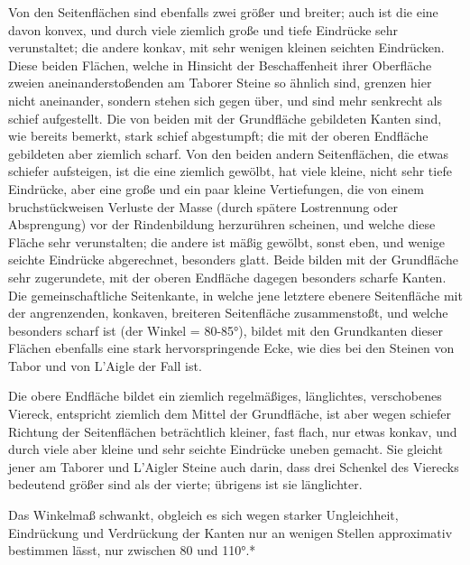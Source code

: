 \documentclass[a4paper, 11pt, oneside, german]{article}
\begin{document}
Von den Seitenflächen sind ebenfalls zwei größer und breiter; auch ist die eine davon konvex, und durch viele ziemlich große und tiefe Eindrücke sehr verunstaltet; die andere konkav, mit sehr wenigen kleinen seichten Eindrücken. Diese beiden Flächen, welche in Hinsicht der Beschaffenheit ihrer Oberfläche zweien aneinanderstoßenden am Taborer Steine so ähnlich sind, grenzen hier nicht aneinander, sondern stehen sich gegen über, und sind mehr senkrecht als schief aufgestellt. Die von beiden mit der Grundfläche gebildeten Kanten sind, wie bereits bemerkt, stark schief abgestumpft; die mit der oberen Endfläche gebildeten aber ziemlich scharf. Von den beiden andern Seitenflächen, die etwas schiefer aufsteigen, ist die eine ziemlich gewölbt, hat viele kleine, nicht sehr tiefe Eindrücke, aber eine große und ein paar kleine Vertiefungen, die von einem bruchstückweisen Verluste der Masse (durch spätere Lostrennung oder Absprengung) vor der Rindenbildung herzurühren scheinen, und welche diese Fläche sehr verunstalten; die andere ist mäßig gewölbt, sonst eben, und wenige seichte Eindrücke abgerechnet, besonders glatt. Beide bilden mit der Grundfläche sehr zugerundete, mit der oberen Endfläche dagegen besonders scharfe Kanten. Die gemeinschaftliche Seitenkante, in welche jene letztere ebenere Seitenfläche mit der angrenzenden, konkaven, breiteren Seitenfläche zusammenstoßt, und welche besonders scharf ist (der Winkel = 80-85°), bildet mit den Grundkanten dieser Flächen ebenfalls eine stark hervorspringende Ecke, wie dies bei den Steinen von Tabor und von L'Aigle der Fall ist.

Die obere Endfläche bildet ein ziemlich regelmäßiges, länglichtes, verschobenes Viereck, entspricht ziemlich dem Mittel der Grundfläche, ist aber wegen schiefer Richtung der Seitenflächen beträchtlich kleiner, fast flach, nur etwas konkav, und durch viele aber kleine und sehr seichte Eindrücke uneben gemacht. Sie gleicht jener am Taborer und L'Aigler Steine auch darin, dass drei Schenkel des Vierecks bedeutend größer sind als der vierte; übrigens ist sie länglichter.

Das Winkelmaß schwankt, obgleich es sich wegen starker Ungleichheit, Eindrückung und Verdrückung der Kanten nur an wenigen Stellen approximativ bestimmen lässt, nur zwischen 80 und 110°.*
\end{document}
